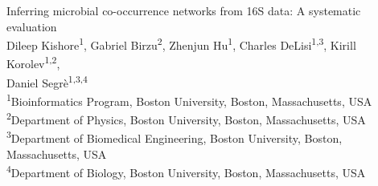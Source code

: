 
\begin{titlepage}

  \newcommand{\HRule}{\rule{\linewidth}{0.5mm}} %

  \center %





  \vspace*{\fill}
  {\huge Inferring microbial co-occurrence networks from 16S data: A systematic evaluation}\\[0.4cm]


  \vspace{1.5 cm}
  Dileep Kishore\textsuperscript{1},
  Gabriel Birzu\textsuperscript{2},
  Zhenjun Hu\textsuperscript{1},
  Charles DeLisi\textsuperscript{1,3},
  Kirill Korolev\textsuperscript{1,2},\\
  Daniel Segr\`{e}\textsuperscript{1,3,4}\\
  \vspace{1cm}
  \textsuperscript{1}Bioinformatics Program, Boston University, Boston, Massachusetts, USA\\
  \textsuperscript{2}Department of Physics, Boston University, Boston, Massachusetts, USA\\
  \textsuperscript{3}Department of Biomedical Engineering, Boston University, Boston, Massachusetts, USA\\
  \textsuperscript{4}Department of Biology, Boston University, Boston, Massachusetts, USA\\




  \vspace*{\fill} %

\end{titlepage}


\newpage
